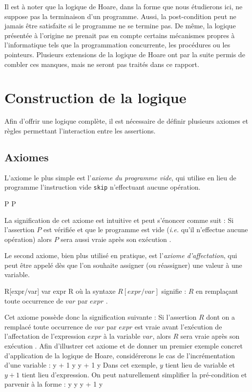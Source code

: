 Il est à noter que la logique de Hoare, dans la forme que nous étudierons ici, ne suppose pas la terminaison d'un programme. Aussi, la post-condition peut ne jamais être satisfaite si le programme ne se termine pas. De même, la logique présentée à l'origine ne prenait pas en compte certains mécanismes propres à l'informatique tels que la programmation concurrente, les procédures ou les pointeurs. Plusieurs extensions de la logique de Hoare ont par la suite permis de combler ces manques, mais ne seront pas traités dans ce rapport.

\section{Construction de la logique}
\label{hoare-construction}
Afin d'offrir une logique complète, il est nécessaire de définir plusieurs axiomes et règles permettant l'interaction entre les assertions.
\subsection{Axiomes}
\label{hoare-axiomes}
L'axiome le plus simple est l'\emph{axiome du programme vide}, qui utilise en lieu de programme l'instruction vide \texttt{skip} n'effectuant aucune opération.
\begin{axiome}
  \hbegin P \ha \hskp \hb P \hend
\end{axiome}

La signification de cet axiome est intuitive et peut s'énoncer comme suit : \og Si l'assertion $P$ est vérifiée et que le programme est vide (\textit{i.e.} qu'il n'effectue aucune opération) alors $P$ sera aussi vraie après son exécution \fg.

Le second axiome, bien plus utilisé en pratique, est l'\emph{axiome d'affectation}, qui peut être appelé dès que l'on souhaite assigner (ou réassigner) une valeur à une variable.
\begin{axiome}
  \hbegin R[expr/var] \ha var \hassign expr \hb R \hend
où la syntaxe $R[expr/var]$ signifie : \og $R$ en remplaçant toute occurrence de $var$ par $expr$ \fg.
\end{axiome}

Cet axiome possède donc la signification suivante : \og Si l'assertion $R$ dont on a remplacé toute occurrence de $var$ par $expr$ est vraie avant l'exécution de l'affectation de l'expression $expr$ à la variable $var$, alors $R$ sera vraie après son exécution \fg. Afin d'illustrer cet axiome et de donner un premier exemple concret d'application de la logique de Hoare, considérerons le cas de l'incrémentation d'une variable :
  \hbegin y + 1  \ha y \hassign y + 1 \hb y  \hend
Dans cet exemple, $y$ tient lieu de variable et $y + 1$ tient lieu d'expression. On peut naturellement simplifier la pré-condition et parvenir à la forme :
  \hbegin y  \ha y \hassign y + 1 \hb y  \hend

